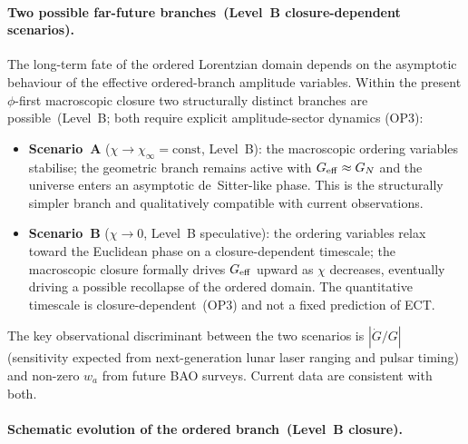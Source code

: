 \documentclass[11pt,a4paper]{article}
\numberwithin{equation}{section}
\begin{document}
\paragraph{Two possible far-future branches~(Level~B closure-dependent scenarios).}

The long-term fate of the ordered Lorentzian domain depends on the
asymptotic behaviour of the effective ordered-branch amplitude variables.
Within the present $\phi$-first macroscopic closure two structurally
distinct branches are possible~(Level~B; both require explicit
amplitude-sector dynamics (OP3):
\begin{itemize}
  \item \textbf{Scenario~A} ($\chi\to\chi_\infty=\text{const}$,
    Level~B): the macroscopic ordering variables stabilise; the
    geometric branch remains active with $G_{\rm eff}\approx G_N$
    and the universe enters an asymptotic de~Sitter-like phase.
    This is the structurally simpler branch and qualitatively
    compatible with current observations.
  \item \textbf{Scenario~B} ($\chi\to0$, Level~B speculative):
    the ordering variables relax toward the Euclidean phase on
    a closure-dependent timescale; the macroscopic closure formally
    drives $G_{\rm eff}$ upward as $\chi$ decreases, eventually
    driving a possible recollapse of the ordered domain.
    The quantitative timescale is closure-dependent~(OP3) and
    not a fixed prediction of ECT.
\end{itemize}
The key observational discriminant between the two scenarios is
$|\dot{G}/G|$ (sensitivity expected from next-generation lunar
laser ranging and pulsar timing) and non-zero $w_a$ from future
BAO surveys.  Current data are consistent with both.

\paragraph{Schematic evolution of the ordered branch~(Level~B closure).}
\end{document}
